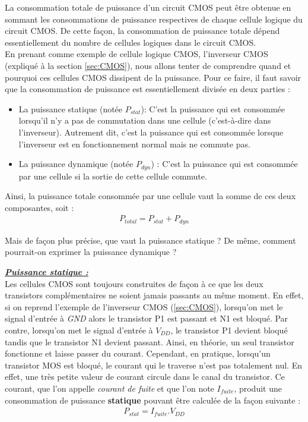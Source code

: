 \documentclass[10pt, oneside, a4paper]{article}
\begin{document}
La consommation totale de puissance d'un circuit CMOS peut être obtenue en sommant les consommations de puissance respectives de chaque cellule logique du circuit CMOS. De cette façon, la consommation de puissance totale dépend essentiellement du nombre de cellules logiques dans le circuit CMOS. \\
En prenant comme exemple de cellule logique CMOS, l'inverseur CMOS (expliqué à la section \ref{sec:CMOS}), nous allons tenter de comprendre quand et pourquoi ces cellules CMOS dissipent de la puissance. Pour ce faire, il faut savoir que la consommation de puissance est essentiellement divisée en deux parties : 
\begin{itemize}
\item La puissance statique (notée $P_{stat}$): C'est la puissance qui est consommée lorsqu'il n'y a pas de commutation dans une cellule (c'est-à-dire dans l'inverseur). Autrement dit, c'est la puissance qui est consommée lorsque l'inverseur est en fonctionnement normal mais ne commute pas.
\item La puissance dynamique (notée $P_{dyn}$) : C'est la puissance qui est consommée par une cellule si la sortie de cette cellule commute. 
\end{itemize}
Ainsi, la puissance totale consommée par une cellule vaut la somme de ces deux composantes, soit :
\begin{gather}
	P_{total} = P_{stat} + P_{dyn}
\end{gather}

Mais de façon plus précise, que vaut la puissance statique ? De même, comment pourrait-on exprimer la puissance dynamique ? 

\hspace{-0.5 cm}\underline{\textbf{\textit{Puissance statique :}}} \vspace{0.2 cm} \\
Les cellules CMOS sont toujours construites de façon à ce que les deux transistors complémentaires ne soient jamais passants au même moment. En effet, si on reprend l'exemple de l'inverseur CMOS (\ref{sec:CMOS}), lorsqu'on met le signal d'entrée à \textit{GND} alors le transistor P1 est passant et N1 est bloqué. Par contre, lorsqu'on met le signal d'entrée à \textit{$V_{DD}$}, le transistor P1 devient bloqué tandis que le transistor N1 devient passant. Ainsi, en théorie, un seul transistor fonctionne et laisse passer du courant. Cependant, en pratique, lorsqu'un transistor MOS est bloqué, le courant qui le traverse n'est pas totalement nul. En effet, une très petite valeur de courant circule dans le canal du transistor. Ce courant, que l'on appelle \textit{courant de fuite} et que l'on note \textit{$I_{fuite}$}, produit une consommation de puissance \textbf{statique} pouvant être calculée de la façon suivante :
\begin{gather}
	P_{stat} = I_{fuite} . V_{DD}
\end{gather}
\end{document}

